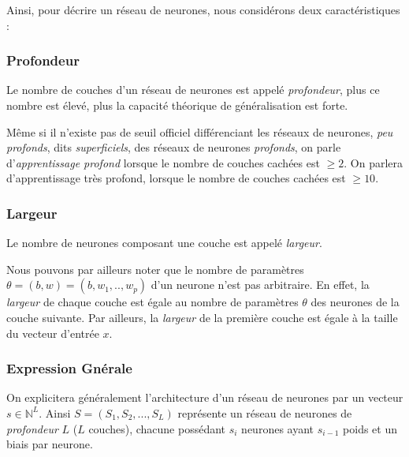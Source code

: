\documentclass[a4paper, 10pt]{report}
\begin{document}
Ainsi, pour décrire un réseau de neurones, nous considérons deux caractéristiques :
\subsubsection{Profondeur}
\begin{center}
	Le nombre de couches d'un réseau de neurones est appelé \emph{profondeur}, plus ce nombre est élevé, plus la capacité théorique de généralisation est forte.
\end{center}
Même si il n'existe pas de seuil officiel différenciant les réseaux de neurones, \emph{peu profonds}, dits \emph{superficiels}, des réseaux de neurones \emph{profonds}, on parle d'\emph{apprentissage profond} lorsque le nombre de couches cachées est $\geq 2$.
On parlera d'apprentissage très profond, lorsque le nombre de couches cachées est $\geq 10$.
\subsubsection{Largeur}
\begin{center}
	Le nombre de neurones composant une couche est appelé \emph{largeur}.
	\end{center}
Nous pouvons par ailleurs noter que le nombre de paramètres $\theta = (b,w) = (b,w_1,..,w_p)$ d'un neurone n'est pas arbitraire.
En effet, la \emph{largeur} de chaque couche est égale au nombre de paramètres $\theta$ des neurones de la couche suivante.
Par ailleurs, la \emph{largeur} de la première couche est égale à la taille du vecteur d'entrée $x$.
\subsubsection{Expression Gnérale}
On explicitera généralement l'architecture d'un réseau de neurones par un vecteur $s \in \mathbb{N}^L$.
Ainsi $S = (S_1, S_2, ..., S_L)$ représente un réseau de neurones de \emph{profondeur} $L$ ($L$ couches), chacune possédant $s_i$ neurones ayant $s_{i-1}$ poids et un biais par neurone.
\end{document}
